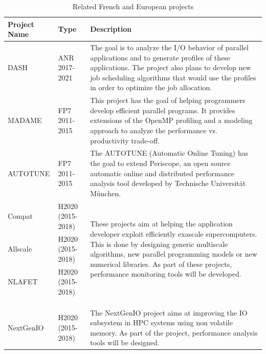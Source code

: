 \documentclass[a4paper,11pt,defblank]{article}
\begin{document}
\begin{table}[H]
\begin{center}
  \begin{tabular} {|l|l|p{9cm}|}\hline
    \textbf{Project Name} & \textbf{Type} &\textbf{Description}\\\hline

    DASH & ANR 2017-2021 & The goal is to analyze the
    I/O behavior of parallel applications and to generate profiles of
    these applications. The project also plans to develop new job
    scheduling algorithms that would use the profiles in order to
    optimize the job allocation.\\\hline

    MADAME & FP7 2011-2015 & This project has the goal of helping
    programmers develop efficient parallel programs. It provides
    extensions of the OpenMP profiling and a modeling approach to
    analyze the performance vs. productivity trade-off.\\\hline

    AUTOTUNE & FP7 2011-2015 & The AUTOTUNE (Automatic Online Tuning)
    has the goal to extend Periscope, an open source automatic online
    and distributed performance analysis tool developed by
    Technische Universität München.\\\hline

    Compat & H2020 (2015-2018)&
    \multirow{3}{*}{\begin{minipage}{9cm}These projects aim at
        helping the application developer exploit efficiently exascale
        supercomputers. This is done by designing generic multiscale
        algorithms, new parallel programming models or new numerical
        libraries. As part of these projects, performance monitoring
        tools will be developed.  \end{minipage}}\\

    Allscale & H2020 (2015-2018)& \\

    NLAFET & H2020 (2015-2018)&\\
    &&\\
    &&\\
    &&\\\hline

    NextGenIO & H2020 (2015-2018) & The NextGenIO project aims at
    improving the IO subsystem in HPC systems using non volatile
    memory. As part of the project, performance analysis tools will
    be designed.\\\hline
  \end{tabular}
\end{center}
\caption{Related French and European projects}
\label{tab:related_projects}
\end{table}
\end{document}

